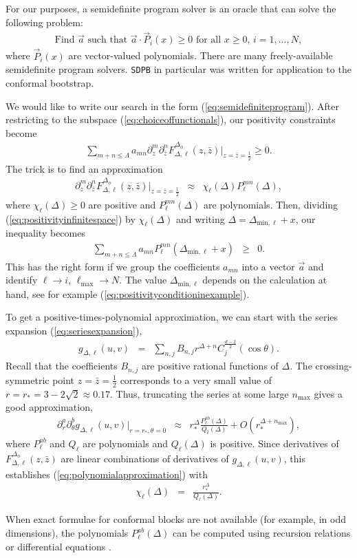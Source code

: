 \documentclass[11pt]{ws-rv9x6}
\newif\ifarxivsubmission
\newcommand\be{\begin{eqnarray}}
\newcommand\ee{\end{eqnarray}}
\newcommand\f\phi
\newcommand\ptl\partial
\newcommand\<\langle
\renewcommand\>\rangle
\renewcommand\.{\cdot}
\newcommand\De{\Delta}
\renewcommand\th{\theta}
\begin{document}
\begin{appendix}
\label{app:semidefinite}

For our purposes, a semidefinite program solver is an oracle that can solve the following problem:
\be
\label{eq:semidefiniteprogram}
\textrm{Find $\vec a$ such that $\vec a \. \vec P_i(x) \geq 0$ for all $x\geq 0$, $i=1,\dots,N$},
\ee
where $\vec P_i(x)$ are vector-valued polynomials.  There are many freely-available semidefinite program solvers.  {\tt SDPB} \cite{Simmons-Duffin:2015qma} in particular was written for application to the conformal bootstrap.

We would like to write our search in the form (\ref{eq:semidefiniteprogram}).
After restricting to the subspace (\ref{eq:choiceoffunctionals}), our positivity constraints become
\be
\label{eq:positivityinfinitespace}
\sum_{m+n\leq \Lambda} a_{mn}\ptl_z^m \ptl_{\bar z}^n F_{\De,\ell}^{\De_\f}(z,\bar z)|_{z=\bar z = \frac 1 2} \geq 0.
\ee
The trick is to find an approximation
\be
\label{eq:polynomialapproximation}
\ptl_z^m \ptl_{\bar z}^n F_{\De,\ell}^{\De_\f}(z,\bar z)|_{z=\bar z= \frac 1 2} &\approx& \chi_\ell(\De) P^{mn}_\ell(\De),
\ee
where $\chi_\ell(\De) \geq 0$ are positive and $P^{mn}_\ell(\De)$ are polynomials.  Then, dividing (\ref{eq:positivityinfinitespace}) by $\chi_\ell(\De)$ and writing $\De=\De_{\mathrm{min},\ell}+x$, our inequality becomes
\be
\sum_{m+n\leq \Lambda} a_{mn} P_\ell^{mn}(\De_{\mathrm{min},\ell}+x) &\geq& 0.
\ee
This has the right form if we group the coefficients $a_{mn}$ into a vector $\vec a$ and identify $\ell\to i$, $\ell_\mathrm{max}\to N$.  The value $\De_{\mathrm{min},\ell}$ depends on the calculation at hand, see for example (\ref{eq:positivityconditioninexample}).

To get a positive-times-polynomial approximation, we can start with the series expansion (\ref{eq:seriesexpansion}),
\be
g_{\De,\ell}(u,v) &=& \sum_{n,j} B_{n,j} r^{\De+n} C_j^{\frac{d-2}{2}}(\cos\th).
\ee
Recall that the coefficients $B_{n,j}$ are positive rational functions of $\De$.  The crossing-symmetric point $z=\bar z = \frac 1 2$ corresponds to a very small value of $r=r_*=3-2\sqrt 2 \approx 0.17$.  Thus, truncating the series at some large $n_\mathrm{max}$ gives a good approximation,
\be
\ptl_r^a \ptl_\th^b g_{\De,\ell}(u,v)|_{r=r_*,\th=0} &\approx & r_*^\De \frac{P^{ab}_\ell(\De)}{Q_\ell(\De)}  + O(r_*^{\De+n_\mathrm{max}}),
\ee
where $P^{ab}_\ell$ and $Q_\ell$ are polynomials and $Q_\ell(\De)$ is positive.  Since derivatives of $F_{\De,\ell}^{\De_\f}(z,\bar z)$ are linear combinations of derivatives of $g_{\De,\ell}(u,v)$, this establishes (\ref{eq:polynomialapproximation}) with
\be
\chi_\ell(\De) &=& \frac{r_*^\De}{Q_\ell(\De)}.
\ee

When exact formulae for conformal blocks are not available (for example, in odd dimensions), the polynomials $P^{ab}_\ell(\De)$ can be computed using recursion relations \cite{Zamolodchikov:1985ie,Zamolodchikov:1987,Kos:2013tga,Kos:2014bka,Penedones:2015aga,Yamazaki:2016vqi,Iliesiu:2015akf} or differential equations \cite{Hogervorst:2013kva}.

\end{appendix}



\ifarxivsubmission
\else
  \blankpage
\fi
\printindex
\end{document}
